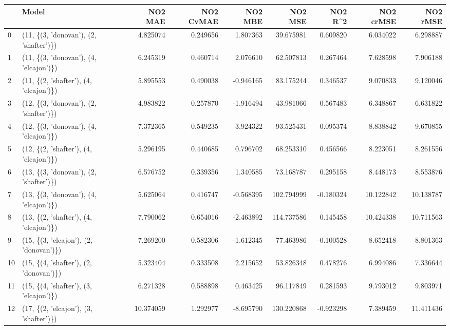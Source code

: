 \begin{tabular}{llrrrrrrr}
\toprule
{} &                                   Model &    NO2 MAE &  NO2 CvMAE &    NO2 MBE &     NO2 MSE &   NO2 R\textasciicircum2 &  NO2 crMSE &   NO2 rMSE \\
\midrule
0  &  (11, \{(3, 'donovan'), (2, 'shafter')\}) &   4.825074 &   0.249656 &   1.807363 &   39.675981 &  0.609820 &   6.034022 &   6.298887 \\
1  &  (11, \{(3, 'donovan'), (4, 'elcajon')\}) &   6.245319 &   0.460714 &   2.076610 &   62.507813 &  0.267464 &   7.628598 &   7.906188 \\
2  &  (11, \{(2, 'shafter'), (4, 'elcajon')\}) &   5.895553 &   0.490038 &  -0.946165 &   83.175244 &  0.346537 &   9.070833 &   9.120046 \\
3  &  (12, \{(3, 'donovan'), (2, 'shafter')\}) &   4.983822 &   0.257870 &  -1.916494 &   43.981066 &  0.567483 &   6.348867 &   6.631822 \\
4  &  (12, \{(3, 'donovan'), (4, 'elcajon')\}) &   7.372365 &   0.549235 &   3.924322 &   93.525431 & -0.095374 &   8.838842 &   9.670855 \\
5  &  (12, \{(2, 'shafter'), (4, 'elcajon')\}) &   5.296195 &   0.440685 &   0.796702 &   68.253310 &  0.456566 &   8.223051 &   8.261556 \\
6  &  (13, \{(3, 'donovan'), (2, 'shafter')\}) &   6.576752 &   0.339356 &   1.340585 &   73.168787 &  0.295158 &   8.448173 &   8.553876 \\
7  &  (13, \{(3, 'donovan'), (4, 'elcajon')\}) &   5.625064 &   0.416747 &  -0.568395 &  102.794999 & -0.180324 &  10.122842 &  10.138787 \\
8  &  (13, \{(2, 'shafter'), (4, 'elcajon')\}) &   7.790062 &   0.654016 &  -2.463892 &  114.737586 &  0.145458 &  10.424338 &  10.711563 \\
9  &  (15, \{(3, 'elcajon'), (2, 'donovan')\}) &   7.269200 &   0.582306 &  -1.612345 &   77.463986 & -0.100528 &   8.652418 &   8.801363 \\
10 &  (15, \{(4, 'shafter'), (2, 'donovan')\}) &   5.323404 &   0.333508 &   2.215652 &   53.826348 &  0.478276 &   6.994086 &   7.336644 \\
11 &  (15, \{(4, 'shafter'), (3, 'elcajon')\}) &   6.271328 &   0.588898 &   0.463425 &   96.117849 &  0.281593 &   9.793012 &   9.803971 \\
12 &  (17, \{(2, 'elcajon'), (3, 'shafter')\}) &  10.374059 &   1.292977 &  -8.695790 &  130.220868 & -0.923298 &   7.389459 &  11.411436 \\

\end{tabular}
